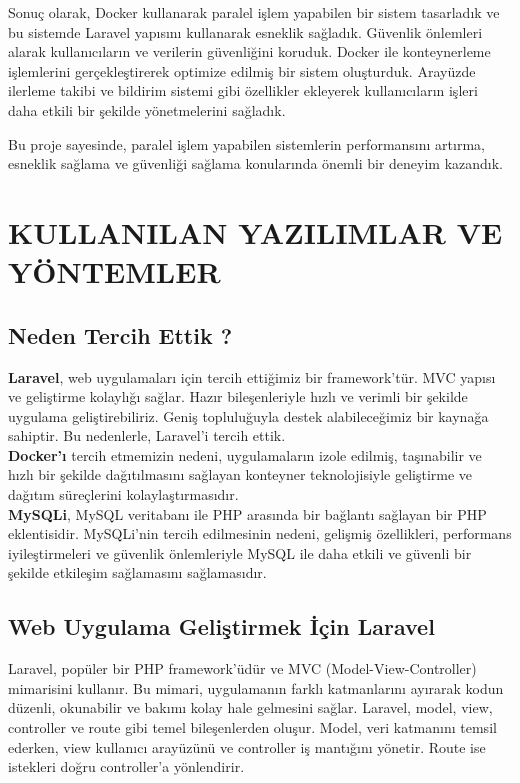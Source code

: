 Sonuç olarak, Docker kullanarak paralel işlem yapabilen bir sistem tasarladık ve bu sistemde Laravel yapısını kullanarak esneklik sağladık. Güvenlik önlemleri alarak kullanıcıların ve verilerin güvenliğini koruduk. Docker ile konteynerleme işlemlerini gerçekleştirerek optimize edilmiş bir sistem oluşturduk. Arayüzde ilerleme takibi ve bildirim sistemi gibi özellikler ekleyerek kullanıcıların işleri daha etkili bir şekilde yönetmelerini sağladık.

Bu proje sayesinde, paralel işlem yapabilen sistemlerin performansını artırma, esneklik sağlama ve güvenliği sağlama konularında önemli bir deneyim kazandık.
\section{KULLANILAN YAZILIMLAR VE YÖNTEMLER}
\subsection{Neden Tercih Ettik ?}
\textbf{Laravel}, web uygulamaları için tercih ettiğimiz bir framework'tür. MVC yapısı ve geliştirme kolaylığı sağlar. Hazır bileşenleriyle hızlı ve verimli bir şekilde uygulama geliştirebiliriz. Geniş topluluğuyla destek alabileceğimiz bir kaynağa sahiptir. Bu nedenlerle, Laravel'i tercih ettik.\\
\textbf{Docker'ı} tercih etmemizin nedeni, uygulamaların izole edilmiş, taşınabilir ve hızlı bir şekilde dağıtılmasını sağlayan konteyner teknolojisiyle geliştirme ve dağıtım süreçlerini kolaylaştırmasıdır.\\
\textbf{MySQLi}, MySQL veritabanı ile PHP arasında bir bağlantı sağlayan bir PHP eklentisidir. MySQLi'nin tercih edilmesinin nedeni, gelişmiş özellikleri, performans iyileştirmeleri ve güvenlik önlemleriyle MySQL ile daha etkili ve güvenli bir şekilde etkileşim sağlamasını sağlamasıdır.
\subsection{Web Uygulama Geliştirmek İçin \textbf{Laravel}}
Laravel, popüler bir PHP framework'üdür ve MVC (Model-View-Controller) mimarisini kullanır. Bu mimari, uygulamanın farklı katmanlarını ayırarak kodun düzenli, okunabilir ve bakımı kolay hale gelmesini sağlar. Laravel, model, view, controller ve route gibi temel bileşenlerden oluşur. Model, veri katmanını temsil ederken, view kullanıcı arayüzünü ve controller iş mantığını yönetir. Route ise istekleri doğru controller'a yönlendirir.\\

